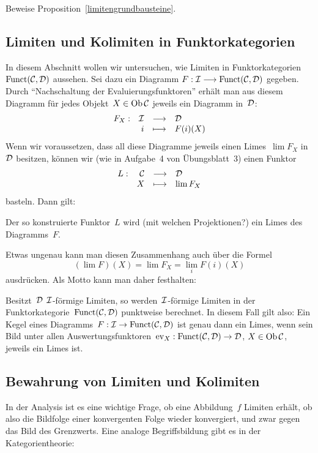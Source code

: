 \begin{aufg}Beweise Proposition~\ref{limitengrundbausteine}.\end{aufg}


\subsection{Limiten und Kolimiten in Funktorkategorien}

In diesem Abschnitt wollen wir untersuchen, wie Limiten in
Funktorkategorien~$\mathrm{Funct}(\mathcal{C},\mathcal{D})$ aussehen. Sei dazu ein Diagramm
$F : \mathcal{I} \longrightarrow \mathrm{Funct}(\mathcal{C},\mathcal{D})$
gegeben. Durch "`Nachschaltung der Evaluierungsfunktoren"' erhält man aus
diesem Diagramm für jedes Objekt~$X \in \operatorname{Ob}\mathcal{C}$ jeweils ein Diagramm in~$\mathcal{D}$:
\[ \begin{array}{@{}rrcl@{}}
  F_X : & \I &\longrightarrow& \D \\
  & i &\longmapsto& F(i)(X)
\end{array} \]
Wenn wir voraussetzen, dass all diese Diagramme jeweils einen Limes~$\lim F_X$ in~$\mathcal{D}$
besitzen, können wir (wie in Aufgabe~4 von Übungsblatt~3) einen Funktor
\[ \begin{array}{@{}rrcl@{}}
  L : & \C &\longrightarrow& \D \\
  & X &\longmapsto& \lim F_X
\end{array} \]
basteln. Dann gilt:
\begin{prop}
Der so konstruierte Funktor~$L$ wird (mit welchen Projektionen?) ein Limes des Diagramms~$F$.
\end{prop}
Etwas ungenau kann man diesen Zusammenhang auch über die Formel
\[ (\lim F)(X) = \lim F_X = \lim_i F(i)(X) \]
ausdrücken. Als Motto kann man daher festhalten:
\begin{motto}Besitzt~$\mathcal{D}$ $\mathcal{I}$-förmige Limiten, so werden~$\mathcal{I}$-förmige Limiten
in der Funktorkategorie~$\mathrm{Funct}(\mathcal{C},\mathcal{D})$ punktweise berechnet. In diesem Fall
gilt also:
Ein Kegel eines Diagramms~$F : \mathcal{I} \to \mathrm{Funct}(\mathcal{C},\mathcal{D})$ ist genau dann ein Limes,
wenn sein Bild unter allen Auswertungsfunktoren~$\mathrm{ev}_X : \mathrm{Funct}(\mathcal{C},\mathcal{D}) \to \mathcal{D}$,
$X \in \operatorname{Ob}\mathcal{C}$, jeweils ein Limes ist.
\end{motto}


\subsection{Bewahrung von Limiten und Kolimiten}

In der Analysis ist es eine wichtige Frage, ob eine Abbildung~$f$ Limiten
erhält, ob also die Bildfolge einer konvergenten Folge wieder konvergiert, und
zwar gegen das Bild des Grenzwerts. Eine analoge Begriffsbildung gibt es in der
Kategorientheorie:

